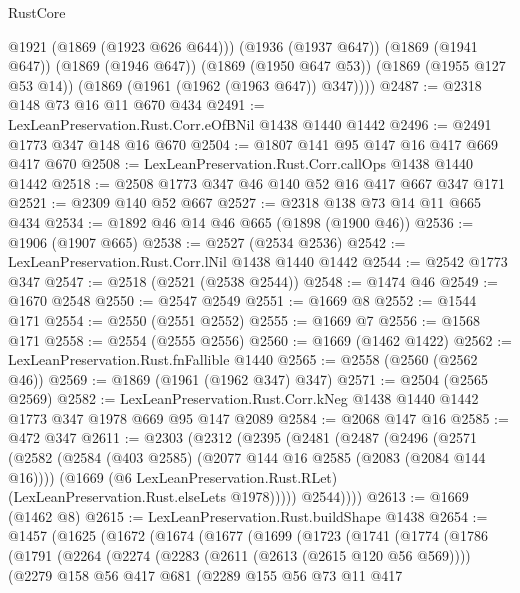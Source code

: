 \begin{lexlean}{RustCore}
\begin{coremodule}
          @1921
          (@1869 (@1923 @626 @644)))
        (@1936 (@1937 @647))
        (@1869 (@1941 @647))
        (@1869 (@1946 @647))
        (@1869 (@1950 @647 @53))
        (@1869 (@1955 @127 @53 @14))
        (@1869 (@1961 (@1962 (@1963 @647)) @347))))
@2487 := @2318 @148 @73 @16 @11 @670 @434
@2491 := LexLeanPreservation.Rust.Corr.eOfBNil @1438 @1440 @1442
@2496 := @2491 @1773 @347 @148 @16 @670
@2504 := @1807 @141 @95 @147 @16 @417 @669 @417 @670
@2508 := LexLeanPreservation.Rust.Corr.callOps @1438 @1440 @1442
@2518 := @2508 @1773 @347 @46 @140 @52 @16 @417 @667 @347 @171
@2521 := @2309 @140 @52 @667
@2527 := @2318 @138 @73 @14 @11 @665 @434
@2534 := @1892 @46 @14 @46 @665 (@1898 (@1900 @46))
@2536 := @1906 (@1907 @665)
@2538 := @2527 (@2534 @2536)
@2542 := LexLeanPreservation.Rust.Corr.lNil @1438 @1440 @1442
@2544 := @2542 @1773 @347
@2547 := @2518 (@2521 (@2538 @2544))
@2548 := @1474 @46
@2549 := @1670 @2548
@2550 := @2547 @2549
@2551 := @1669 @8
@2552 := @1544 @171
@2554 := @2550 (@2551 @2552)
@2555 := @1669 @7
@2556 := @1568 @171
@2558 := @2554 (@2555 @2556)
@2560 := @1669 (@1462 @1422)
@2562 := LexLeanPreservation.Rust.fnFallible @1440
@2565 := @2558 (@2560 (@2562 @46))
@2569 := @1869 (@1961 (@1962 @347) @347)
@2571 := @2504 (@2565 @2569)
@2582 := LexLeanPreservation.Rust.Corr.kNeg @1438 @1440 @1442 @1773 @347 @1978 @669 @95 @147 @2089
@2584 := @2068 @147 @16
@2585 := @472 @347
@2611 := @2303
    (@2312
      (@2395
        (@2481
          (@2487
            (@2496
              (@2571
                (@2582
                  (@2584 (@403 @2585) (@2077 @144 @16 @2585 (@2083 (@2084 @144 @16))))
                  (@1669
                    (@6 LexLeanPreservation.Rust.RLet)
                    (LexLeanPreservation.Rust.elseLets @1978)))))
            @2544))))
@2613 := @1669 (@1462 @8)
@2615 := LexLeanPreservation.Rust.buildShape @1438
@2654 := @1457
    (@1625
      (@1672
        (@1674
          (@1677
            (@1699
              (@1723
                (@1741
                  (@1774
                    (@1786
                      (@1791
                        (@2264
                          (@2274
                            (@2283 (@2611 (@2613 (@2615 @120 @56 @569))))
                            (@2279
                              @158
                              @56
                              @417
                              @681
                              (@2289
                                @155
                                @56
                                @73
                                @11
                                @417

\end{coremodule}
\end{lexlean}
